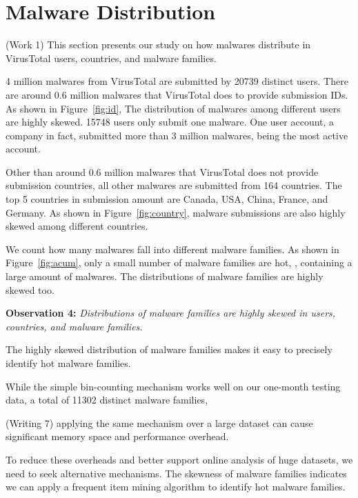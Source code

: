 \section{Malware Distribution}
\label{sec:dist}





{\color{red} (Work 1)
This section presents our study on how malwares distribute in VirusTotal users, countries, and malware families.

4 million malwares from VirusTotal are submitted by 20739 distinct users.
There are around 0.6 million malwares that VirusTotal does to provide submission IDs. 
As shown in Figure~\ref{fig:id}, 
The distribution of malwares among different users are highly skewed. 
15748 users only submit one malware. 
One user account, a company in fact, submitted more than 3 million malwares, 
being the most active account.

Other than around 0.6 million malwares that VirusTotal does not provide submission countries,
all other malwares are submitted from 164 countries. 
The top 5 countries in submission amount are Canada, USA, China, France, and Germany. 
As shown in Figure~\ref{fig:country}, 
malware submissions are also highly skewed among different countries. 

We count how many malwares fall into different malware families.
As shown in Figure~\ref{fig:acum}, only a small number of malware families are hot, \ie, containing a large amount of malwares.
The distributions of malware families are highly skewed too.

{\bf Observation 4:} {\em Distributions of malware families are highly skewed in users, countries, and malware families.}

}

The highly skewed distribution of malware families makes it easy to precisely identify hot malware families. 

While the simple bin-counting mechanism works well on our one-month testing data, 
a total of 11302 distinct malware families, {\color{red} (Writing 7)
applying the same mechanism over a large dataset can cause significant memory space and performance overhead.

To reduce these overheads and better support online analysis of huge datasets, 
we need to seek alternative mechanisms.
The skewness of malware families indicates we can apply a frequent item mining algorithm to identify hot malware families. 
}

